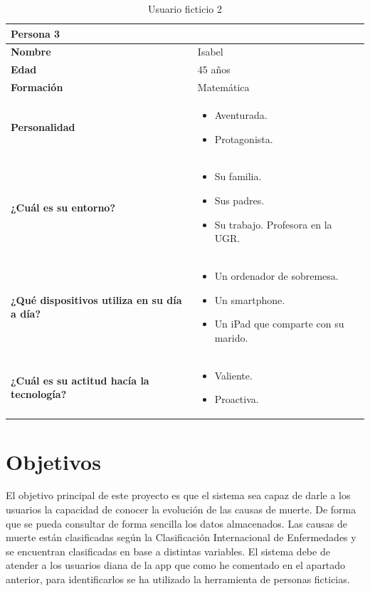 \begin{table}[H]
	\begin{center}
		\begin{tabular}{| p{} |
                   p{} |}
			\hline
			Persona 3 &  \\ \hline
			\textbf{Nombre} & Isabel \\
			\textbf{Edad} & 45 años \\
			\textbf{Formación} & Matemática \\
			\textbf{Personalidad} & \begin{itemize}
                \item Aventurada.
                \item Protagonista.
            \end{itemize} \\
			\textbf{¿Cuál es su entorno?} & \begin{itemize}
                \item Su familia.
                \item Sus padres.
                \item Su trabajo. Profesora en la UGR.
            \end{itemize} \\
			\textbf{¿Qué dispositivos utiliza en su día a día?} & \begin{itemize}
                \item Un ordenador de sobremesa.
                \item Un smartphone.
                \item Un iPad que comparte con su marido.
            \end{itemize} \\
            \textbf{¿Cuál es su actitud hacía la tecnología?} & \begin{itemize}
                \item Valiente.
                \item Proactiva.
            \end{itemize} \\
            \hline
		\end{tabular}
		\caption{Usuario ficticio 2}
	\end{center}
\end{table}


\section{Objetivos}
\label{sec:obj}
El objetivo principal de este proyecto es que el sistema sea capaz de darle a los usuarios la capacidad de conocer la evolución de las causas de muerte. De forma que se pueda consultar de forma sencilla los datos almacenados. Las causas de muerte están clasificadas según la Clasificación Internacional de Enfermedades y se encuentran clasificadas en base a distintas variables. El sistema debe de atender a los usuarios diana de la app que como he comentado en el apartado anterior, para identificarlos se ha utilizado la herramienta de personas ficticias. 
